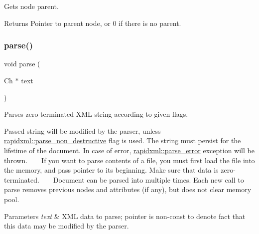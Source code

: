 Gets node parent. 

\begin{DoxyReturn}{Returns}
Pointer to parent node, or 0 if there is no parent. 
\end{DoxyReturn}
\mbox{\label{classrapidxml_1_1xml__document_aa280fd704731128b4556b41c1e9182b8}} 
\subsubsection{\texorpdfstring{parse()}{parse()}}
{\footnotesize\ttfamily void parse (\begin{DoxyParamCaption}\item[{Ch $\ast$}]{text }\end{DoxyParamCaption})\hspace{0.3cm}{\ttfamily [inline]}}



Parses zero-\/terminated X\+ML string according to given flags. 

Passed string will be modified by the parser, unless \mbox{\hyperlink{namespacerapidxml_aa97ba1a0a79a6d66f4eef3612508d943}{rapidxml\+::parse\+\_\+non\+\_\+destructive}} flag is used. The string must persist for the lifetime of the document. In case of error, \mbox{\hyperlink{classrapidxml_1_1parse__error}{rapidxml\+::parse\+\_\+error}} exception will be thrown. ~\newline
~\newline
 If you want to parse contents of a file, you must first load the file into the memory, and pass pointer to its beginning. Make sure that data is zero-\/terminated. ~\newline
~\newline
 Document can be parsed into multiple times. Each new call to parse removes previous nodes and attributes (if any), but does not clear memory pool. 
\begin{DoxyParams}{Parameters}
{\em text} & X\+ML data to parse; pointer is non-\/const to denote fact that this data may be modified by the parser. \\
\hline
\end{DoxyParams}
\mbox{\label{classrapidxml_1_1xml__node_af6dffa513da74cc0be71a7ba84f8265e}} 
